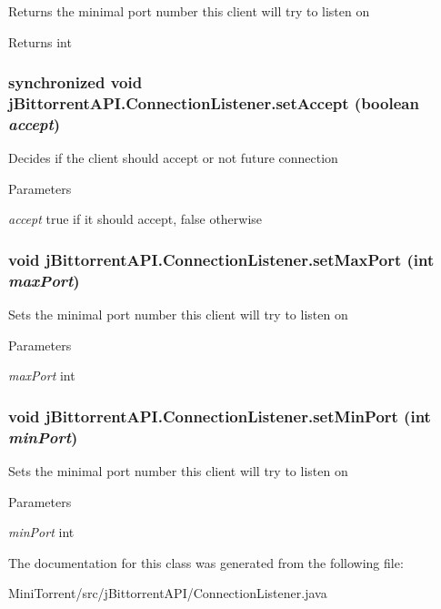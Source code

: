 \label{classj_bittorrent_a_p_i_1_1_connection_listener_abbc53be91686fc734c3614599dc05b61}
Returns the minimal port number this client will try to listen on \begin{DoxyReturn}{Returns}
int 
\end{DoxyReturn}
\hypertarget{classj_bittorrent_a_p_i_1_1_connection_listener_a9ce7e9af2b58633fd8ba05816ba8eaa0}{
\subsubsection[{setAccept}]{\setlength{\rightskip}{0pt plus 5cm}synchronized void jBittorrentAPI.ConnectionListener.setAccept (boolean {\em accept})}}
\label{classj_bittorrent_a_p_i_1_1_connection_listener_a9ce7e9af2b58633fd8ba05816ba8eaa0}
Decides if the client should accept or not future connection 
\begin{DoxyParams}{Parameters}
\item[{\em accept}]true if it should accept, false otherwise \end{DoxyParams}
\hypertarget{classj_bittorrent_a_p_i_1_1_connection_listener_a2347c592c92fadb16db0670aaa7e4bc6}{
\subsubsection[{setMaxPort}]{\setlength{\rightskip}{0pt plus 5cm}void jBittorrentAPI.ConnectionListener.setMaxPort (int {\em maxPort})}}
\label{classj_bittorrent_a_p_i_1_1_connection_listener_a2347c592c92fadb16db0670aaa7e4bc6}
Sets the minimal port number this client will try to listen on 
\begin{DoxyParams}{Parameters}
\item[{\em maxPort}]int \end{DoxyParams}
\hypertarget{classj_bittorrent_a_p_i_1_1_connection_listener_a4f09e7b9a9958e47a474c16d063e610f}{
\subsubsection[{setMinPort}]{\setlength{\rightskip}{0pt plus 5cm}void jBittorrentAPI.ConnectionListener.setMinPort (int {\em minPort})}}
\label{classj_bittorrent_a_p_i_1_1_connection_listener_a4f09e7b9a9958e47a474c16d063e610f}
Sets the minimal port number this client will try to listen on 
\begin{DoxyParams}{Parameters}
\item[{\em minPort}]int \end{DoxyParams}


The documentation for this class was generated from the following file:\begin{DoxyCompactItemize}
\item 
MiniTorrent/src/jBittorrentAPI/ConnectionListener.java\end{DoxyCompactItemize}
